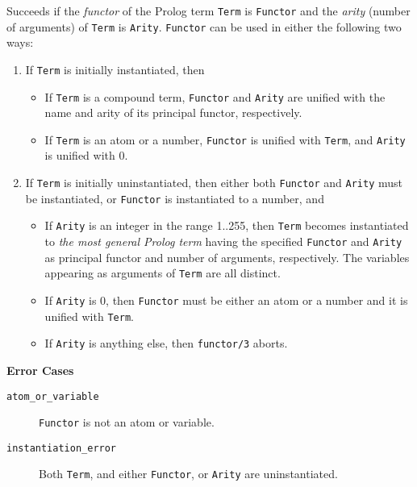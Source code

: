 \begin{description}
    Succeeds if the {\em functor} of the Prolog term {\tt Term} is 
    {\tt Functor} and the {\em arity} (number of arguments) of {\tt Term} is
    {\tt Arity}\@.  {\tt Functor} can be used in either the following two 
    ways:
    \begin{enumerate}
    \item If {\tt Term} is initially instantiated, then
          \begin{itemize}
          \item If {\tt Term} is a compound term, {\tt Functor} and 
                {\tt Arity} are unified with the name and arity of 
                its principal functor, respectively. 
          \item If {\tt Term} is an atom or a number, {\tt Functor} is 
                unified with {\tt Term}, and {\tt Arity} is unified with 0.
          \end{itemize}
    \item If {\tt Term} is initially uninstantiated, then either both 
          {\tt Functor} and {\tt Arity} must be instantiated, or {\tt Functor}
          is instantiated to a number, and
          \begin{itemize}
          \item If {\tt Arity} is an integer in the range 1..255, then
                {\tt Term} becomes instantiated to {\em the most general 
                Prolog term} having the specified {\tt Functor} and 
                {\tt Arity} as principal functor and number of arguments,
                respectively. The variables appearing as arguments of 
                {\tt Term} are all distinct.
          \item If {\tt Arity} is 0, then {\tt Functor} must be either an 
                atom or a number and it is unified with {\tt Term}. 
          \item If {\tt Arity} is anything else, then {\tt functor/3} aborts.
          \end{itemize}
    \end{enumerate}

{\bf Error Cases}
    \begin{description}
    \item[{\tt atom\_or\_variable}]
	{\tt Functor} is not an atom or variable.
    \item[{\tt instantiation\_error}]
	Both {\tt Term}, and either {\tt Functor}, or {\tt Arity} are 
	uninstantiated.
    \end{description}


\end{description}

